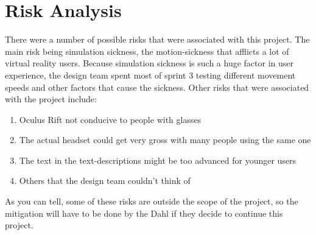 \section{Risk Analysis}
There were a number of possible risks that were associated with this project.  The main risk being simulation sickness, the motion-sickness that afflicts a lot of virtual reality users.  Because simulation sickness is such a huge factor in user experience, the design team spent most of sprint 3 testing different movement speeds and other factors that cause the sickness.
Other risks that were associated with the project include:
	\begin{enumerate}
	\item Oculus Rift not conducive to people with glasses
	\item The actual headset could get very gross with many people using the same one
	\item The text in the text-descriptions might be too advanced for younger users
	\item Others that the design team couldn't think of
	\end{enumerate}
As you can tell, some of these risks are outside the scope of the project, so the mitigation will have to be done by the Dahl if they decide to continue this project. 
